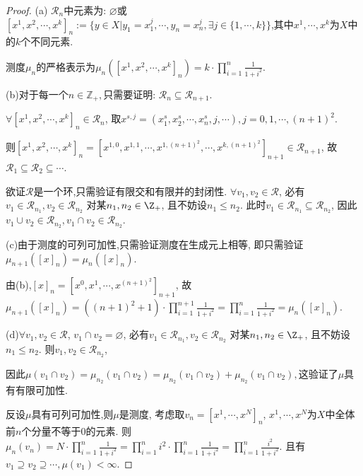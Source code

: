 \begin{proof}
    (a) $\mathcal{R}_n$中元素为: $\varnothing $或$[x^1, x^2, \cdots , x^k]_n :=\{y\in X| y_1 = x_1^j,\cdots , y_n = x_n^j,\exists j \in \{1,\cdots, k\}\}$,其中$x^1,\cdots,x^k$为$X$中的$k$个不同元素.

    测度$\mu_n$的严格表示为$\mu_n([x^1, x^2, \cdots , x^k]_n ) = k \cdot \prod \limits_{i=1}^n \frac{1}{1+i^2}$.


    (b)对于每一个$n\in \mathbb{Z}_+,$只需要证明: $\mathcal{R}_n \subseteq \mathcal{R}_{n+1}$.

    $\forall [x^1, x^2, \cdots , x^k]_n \in \mathcal{R}_n$,
    取$x^{s,j} = (x_1^s,x_2^s,\cdots, x_n^s,j,\cdots), j=0,1,\cdots, (n+1)^2$.

    则$[x^1, x^2, \cdots , x^k] _n  =[x^{1,0},x^{1,1},\cdots, x^{1,(n+1)^2}, \cdots, x^{k,(n+1)^2}]_{n+1} \in \mathcal{R}_{n+1} $,
    故$\mathcal{R}_1 \subseteq \mathcal{R}_2\subseteq \cdots$.

    欲证$\mathcal{R}$是一个环,只需验证有限交和有限并的封闭性.
    $\forall v_1, v_2\in \mathcal{R}$,
    必有$v_1 \in \mathcal{R}_{n_1}, v_2 \in \mathcal{R}_{n_2}$
    对某$n_1, n_2 \in \Z_+$, 且不妨设$n_1 \leq n_2$.
    此时$v_1\in \mathcal{R}_{n_1} \subseteq \mathcal{R}_{n_2}$, 
    因此$v_1 \cup v_2 \in \mathcal{R}_{n_2}, v_1 \cap v_2 \in \mathcal{R}_{n_2}$.

    (c)由于测度的可列可加性,只需验证测度在生成元上相等,
    即只需验证$\mu_{n+1}([x]_n) = \mu_n([x]_n)$.

    由(b),$[x]_n = [x^0, x^1, \cdots, x^{(n+1)^2}]_{n+1}$,
    故$\mu_{n+1} ([x]_n) = ((n+1)^2 + 1) \cdot \prod \limits_{i=1}^{n+1} \frac{1}{1+i^2} = \prod \limits_{i=1}^{n} \frac{1}{1+i^2}=\mu_n([x]_n).$

    (d)$\forall v_1, v_2\in \mathcal{R}$, $v_1\cap v_2 = \varnothing$,
    必有$v_1 \in \mathcal{R}_{n_1}, v_2 \in \mathcal{R}_{n_2}$
    对某$n_1, n_2 \in \Z_+$, 且不妨设$n_1 \leq n_2$.
    则$v_1,v_2\in \mathcal{R}_{n_2}$, 
    
    因此$\mu(v_1 \cap v_2) = \mu_{n_2}(v_1 \cap v_2) = \mu_{n_2}(v_1 \cap v_2) + \mu_{n_2}(v_1 \cap v_2),$这验证了$\mu$具有有限可加性.

    反设$\mu$具有可列可加性,则$\mu$是测度, 
    考虑取$v_n = [x^1,\cdots, x^N]_n$, 
    $x^1,\cdots ,x^N$为$X$中全体前$n$个分量不等于$0$的元素.
    则$\mu_n(v_n) = N \cdot \prod \limits_{i=1}^n \frac{1}{1+i^2} 
    = \prod \limits_{i=1}^n i^2 \cdot \prod \limits_{i=1}^n \frac{1}{1+i^2} 
    = \prod \limits_{i=1}^n \frac{i^2}{1+i^2}.$
    且有$v_1 \supseteq v_2 \supseteq \cdots, \mu(v_1) < \infty$.


\end{proof}
